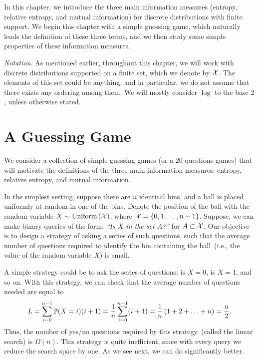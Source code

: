     In this chapter, we introduce the three main information measures (entropy, relative entropy, and mutual information) for discrete distributions with finite support. We begin this chapter with a simple guessing game, which naturally leads the definition of these three terms, and we then study some simple properties of these information measures. 

    \emph{Notation.} As mentioned earlier, throughout this chapter, we will work with discrete distributions supported on a finite set, which we denote by $\mathcal{X}$. The elements of this set could be anything, and in particular, we do not assume that there exists any ordering among them. We will mostly consider $\log$ to the base $2$, unless otherwise stated. 

    \section{A Guessing Game}
    \label{sec:guessing-game}
        We consider a collection of simple guessing games (or a 20 questions games)  that will motivate the definitions of the three main information measures: entropy, relative entropy, and mutual information. 

       \begin{question} 
           \label{question:binary-search-game}
           In the simplest setting, suppose there are $n$ identical bins, and a ball is placed uniformly at random in one of the bins. Denote the position of the ball with the random variable $X \sim \text{Uniform}\left( \mathcal{X} \right)$, where $\mathcal{X} = \{0, 1, \ldots, n-1\}$. Suppose, we can make binary queries of the form: \emph{``Is $X$ in the set $A$?''} for $A \subset \mathcal{X}$.  Our objective is to design a strategy of asking a series of such questions, such that the average number of questions required to identify the bin containing the ball~(i.e., the value of the random variable $X$) is small. 
       \end{question} 

        A simple strategy could be to ask the series of questions: is $X=0$, is $X=1$, and so on. With this strategy, we can check that the average number of questions needed are equal to 
        \begin{align}
            L = \sum_{i=0}^{n-1} \mathbb{P}(X=i) (i+1) = \frac{1}{n} \sum_{i=0}^{n-1} (i+1) = \frac{1}{n} \left( 1 + 2 + \ldots + n\right) = \frac{n}{2}. 
        \end{align}
        Thus, the number of yes/no questions required by this strategy~(called the linear search) is $\Omega(n)$. This strategy is quite inefficient, since with every query we reduce the search space by one. As we see next, we can do significantly better. 

